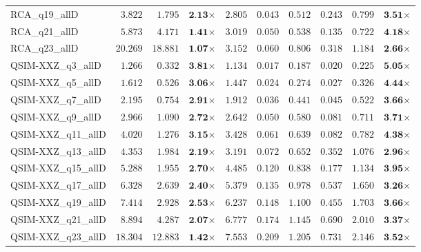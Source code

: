 \begin{table*}[t]
{\begin{tabular}{| l || r r c || r r r r r c |}
RCA\_q19\_allD & $3.822$ & $1.795$ & $\textbf{2.13}$$\times$ & $2.805$ & $0.043$ & $0.512$ & $0.243$ & $0.799$ & $\textbf{3.51}$$\times$ \\
RCA\_q21\_allD & $5.873$ & $4.171$ & $\textbf{1.41}$$\times$ & $3.019$ & $0.050$ & $0.538$ & $0.135$ & $0.722$ & $\textbf{4.18}$$\times$ \\
RCA\_q23\_allD & $20.269$ & $18.881$ & $\textbf{1.07}$$\times$ & $3.152$ & $0.060$ & $0.806$ & $0.318$ & $1.184$ & $\textbf{2.66}$$\times$ \\
QSIM-XXZ\_q3\_allD & $1.266$ & $0.332$ & $\textbf{3.81}$$\times$ & $1.134$ & $0.017$ & $0.187$ & $0.020$ & $0.225$ & $\textbf{5.05}$$\times$ \\
QSIM-XXZ\_q5\_allD & $1.612$ & $0.526$ & $\textbf{3.06}$$\times$ & $1.447$ & $0.024$ & $0.274$ & $0.027$ & $0.326$ & $\textbf{4.44}$$\times$ \\
QSIM-XXZ\_q7\_allD & $2.195$ & $0.754$ & $\textbf{2.91}$$\times$ & $1.912$ & $0.036$ & $0.441$ & $0.045$ & $0.522$ & $\textbf{3.66}$$\times$ \\
QSIM-XXZ\_q9\_allD & $2.966$ & $1.090$ & $\textbf{2.72}$$\times$ & $2.642$ & $0.050$ & $0.580$ & $0.081$ & $0.711$ & $\textbf{3.71}$$\times$ \\
QSIM-XXZ\_q11\_allD & $4.020$ & $1.276$ & $\textbf{3.15}$$\times$ & $3.428$ & $0.061$ & $0.639$ & $0.082$ & $0.782$ & $\textbf{4.38}$$\times$ \\
QSIM-XXZ\_q13\_allD & $4.353$ & $1.984$ & $\textbf{2.19}$$\times$ & $3.191$ & $0.072$ & $0.652$ & $0.352$ & $1.076$ & $\textbf{2.96}$$\times$ \\
QSIM-XXZ\_q15\_allD & $5.288$ & $1.955$ & $\textbf{2.70}$$\times$ & $4.485$ & $0.120$ & $0.838$ & $0.177$ & $1.134$ & $\textbf{3.95}$$\times$ \\
QSIM-XXZ\_q17\_allD & $6.328$ & $2.639$ & $\textbf{2.40}$$\times$ & $5.379$ & $0.135$ & $0.978$ & $0.537$ & $1.650$ & $\textbf{3.26}$$\times$ \\
QSIM-XXZ\_q19\_allD & $7.414$ & $2.928$ & $\textbf{2.53}$$\times$ & $6.237$ & $0.148$ & $1.100$ & $0.455$ & $1.703$ & $\textbf{3.66}$$\times$ \\
QSIM-XXZ\_q21\_allD & $8.894$ & $4.287$ & $\textbf{2.07}$$\times$ & $6.777$ & $0.174$ & $1.145$ & $0.690$ & $2.010$ & $\textbf{3.37}$$\times$ \\
QSIM-XXZ\_q23\_allD & $18.304$ & $12.883$ & $\textbf{1.42}$$\times$ & $7.553$ & $0.209$ & $1.205$ & $0.731$ & $2.146$ & $\textbf{3.52}$$\times$ \\
\hline
\end{tabular}
}
\end{table*}
